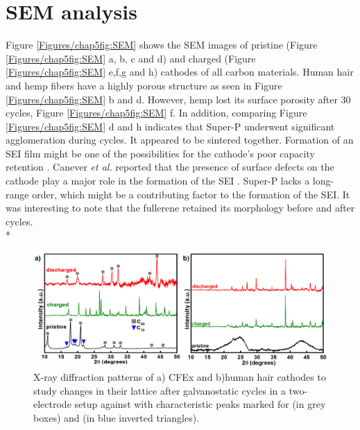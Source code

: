 \section*{SEM analysis}
Figure \ref{Figures/chap5fig:SEM} shows the SEM images of pristine (Figure \ref{Figures/chap5fig:SEM} a, b, c and d) and charged (Figure \ref{Figures/chap5fig:SEM} e,f,g and h) cathodes of all carbon materials. Human hair and hemp fibers have a highly porous structure as seen in Figure \ref{Figures/chap5fig:SEM} b and d. However, hemp lost its surface porosity after 30 cycles, Figure \ref{Figures/chap5fig:SEM} f. In addition, comparing Figure \ref{Figures/chap5fig:SEM} d and h indicates that Super-P underwent significant agglomeration during cycles. It appeared to be sintered together. Formation of an SEI film might be one of the possibilities for the cathode's poor capacity retention \cite{}. Canever \textit{et al.} reported that the presence of surface defects on the cathode play a major role in the formation of the SEI \cite{canever_solid-electrolyte_2020}. Super-P lacks a long-range order, which might be a contributing factor to the formation of the SEI. It was interesting to note that the fullerene retained its morphology before and after cycles.\\*

\begin{figure}[h!]
  \centering
  \includegraphics[width=\textwidth]{Figures/chap5fig/XRD}
    \caption{X-ray diffraction patterns of a) CFEx and b)human hair cathodes to study changes in their lattice after galvanostatic cycles in a two-electrode setup against  with characteristic peaks marked for  (in grey boxes) and  (in blue inverted triangles).}
  \label{Figures/chap5fig:XRD}
\end{figure}

